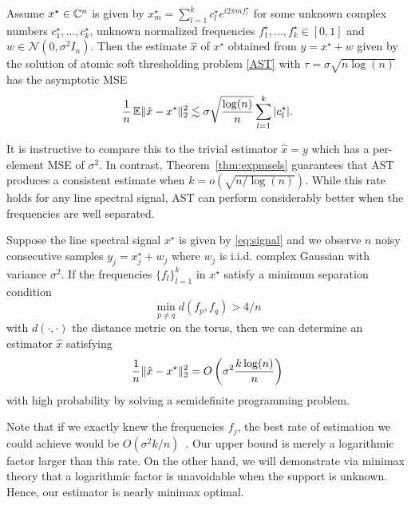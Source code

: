 \begin{theorem}
\label{thm:expmsels}

Assume $x^\star \in \mathbb{C}^n$ is given by $x_m^\star = \sum_{l=1}^k{c_l^\star
e^{i2\pi m f_l^\star}}$ for some unknown complex numbers $c_1^\star, \ldots,
c_k^\star$, unknown normalized frequencies $f_1^\star, \ldots, f_k^\star \in
[0,1]$ and $w \in \mathcal{N}(0,\sigma^2 I_n)$. Then the estimate $\hat{x}$ of
$x^\star$ obtained from $y=x^\star+w$ given by the solution of atomic soft
thresholding problem \eqref{AST} with $\tau = \sigma \sqrt{n \log(n)}$ has the
asymptotic MSE \belowdisplayskip=-10pt \[ \frac{1}{n} \operatorname{\mathbb{E}} \lVert\hat{x} -
x^\star\rVert_2^2 \lesssim \sigma\sqrt{\frac{\log(n)}{n}}\sum_{l=1}^k |c_l^\star|. \]
\end{theorem}

It is instructive to compare this to the trivial estimator $\hat{x} = y$ which
has a per-element MSE of $\sigma^2$. In contrast, Theorem~\ref{thm:expmsels}
guarantees that AST produces a consistent estimate when $k =
o(\sqrt{n/\log(n)})$. While this rate holds for any line spectral signal, AST
can perform considerably better when the frequencies are well separated.

\begin{theorem}
\label{main}
Suppose the line spectral signal $x^\star$ is given by \eqref{eq:signal}
and we observe $n$ noisy consecutive samples $y_j = x^\star_j + w_j$ where $w_j$ is i.i.d. complex Gaussian with variance $\sigma^2$. If the frequencies  $\{f_l\}_{l=1}^k$ in $x^\star$ satisfy a minimum separation condition
\begin{equation}
\label{min-sep}
\min_{p\neq q}d(f_p,f_q) > 4/n
\end{equation}
with $d(\cdot, \cdot)$ the distance metric on the torus, then we can determine an estimator $\hat{x}$ satisfying
\begin{equation}
\label{fast-rate}
\frac{1}{n}\lVert\hat{x} - x^\star\rVert_2^2 = O\left( \sigma^2 \frac{k \log(n)}{n}\right)  
\end{equation}
with high probability by solving a semidefinite programming problem.
\end{theorem}

Note that if we exactly knew the frequencies $f_j$, the best rate of estimation we could achieve would be $O(\sigma^2 k / n)$~\cite{oracle_lasso}.  Our upper bound is merely a logarithmic factor larger than this rate.  On the other hand, we will demonstrate via minimax theory that a logarithmic factor is unavoidable when the support is unknown.  Hence, our estimator is nearly minimax optimal. 

